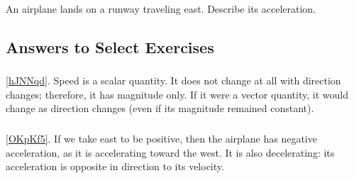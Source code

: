 \documentclass[main-ap-physics.tex]{subfiles}
\begin{document}
\begin{exercise} \label{OKpKf5}
    An airplane lands on a runway traveling east. Describe its acceleration.
\end{exercise}

\subsection{Answers to Select Exercises}

\subsubsection*{} %

\ref{hJNNqd}. Speed is a scalar quantity. It does not change at all with direction changes; therefore, it has magnitude only. If it were a vector quantity, it would change as direction changes (even if its magnitude remained constant).\\

\subsubsection*{} %

\ref{OKpKf5}. If we take east to be positive, then the airplane has negative acceleration, as it is accelerating toward the west. It is also decelerating: its acceleration is opposite in direction to its velocity.\\
\end{document}

